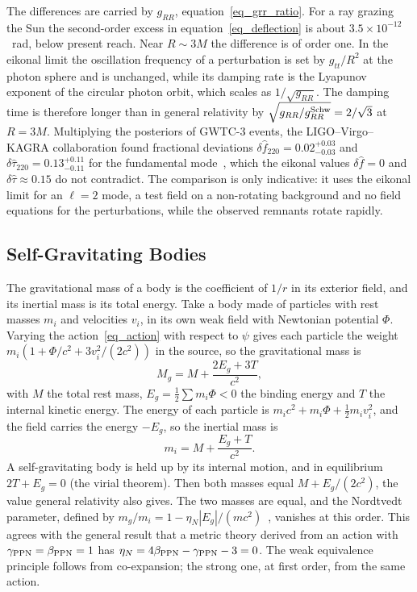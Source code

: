 \documentclass{iopjournal}
\begin{document}
The differences are carried by $g_{RR}$, equation~\eqref{eq_grr_ratio}. For a ray grazing the Sun the second-order excess in equation~\eqref{eq_deflection} is about $3.5\times10^{-12}$~rad, below present reach. Near $R\sim3M$ the difference is of order one. In the eikonal limit the oscillation frequency of a perturbation is set by $g_{tt}/R^2$ at the photon sphere and is unchanged, while its damping rate is the Lyapunov exponent of the circular photon orbit, which scales as $1/\sqrt{g_{RR}}$. The damping time is therefore longer than in general relativity by $\sqrt{g_{RR}/g_{RR}^{\rm Schw}}=2/\sqrt3$ at $R=3M$. Multiplying the posteriors of GWTC-3 events, the LIGO--Virgo--KAGRA collaboration found fractional deviations $\delta\hat f_{220}=0.02^{+0.03}_{-0.03}$ and $\delta\hat\tau_{220}=0.13^{+0.11}_{-0.11}$ for the fundamental mode~\cite{LVK2025TGRGWTC3}, which the eikonal values $\delta\hat f=0$ and $\delta\hat\tau\approx0.15$ do not contradict. The comparison is only indicative: it uses the eikonal limit for an $\ell=2$ mode, a test field on a non-rotating background and no field equations for the perturbations, while the observed remnants rotate rapidly.

\subsection{Self-Gravitating Bodies}\label{sec_sep}

The gravitational mass of a body is the coefficient of $1/r$ in its exterior field, and its inertial mass is its total energy. Take a body made of particles with rest masses $m_i$ and velocities $v_i$, in its own weak field with Newtonian potential $\Phi$. Varying the action~\eqref{eq_action} with respect to $\psi$ gives each particle the weight $m_i\left(1+\Phi/c^2+3v_i^2/(2c^2)\right)$ in the source, so the gravitational mass is
\begin{equation}
    M_g=M+\frac{2E_g+3T}{c^2},
\end{equation}
with $M$ the total rest mass, $E_g=\tfrac12\sum m_i\Phi<0$ the binding energy and $T$ the internal kinetic energy. The energy of each particle is $m_ic^2+m_i\Phi+\tfrac12m_iv_i^2$, and the field carries the energy $-E_g$, so the inertial mass is
\begin{equation}
    m_i=M+\frac{E_g+T}{c^2}.
\end{equation}
A self-gravitating body is held up by its internal motion, and in equilibrium $2T+E_g=0$ (the virial theorem). Then both masses equal $M+E_g/(2c^2)$, the value general relativity also gives. The two masses are equal, and the Nordtvedt parameter, defined by $m_g/m_i=1-\eta_N|E_g|/(mc^2)$~\cite{Will2014}, vanishes at this order. This agrees with the general result that a metric theory derived from an action with $\gamma_{\rm PPN}=\beta_{\rm PPN}=1$ has $\eta_N=4\beta_{\rm PPN}-\gamma_{\rm PPN}-3=0$. The weak equivalence principle follows from co-expansion; the strong one, at first order, from the same action.
\end{document}
